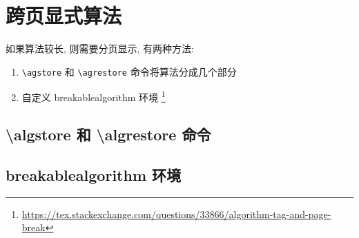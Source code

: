 \section{跨页显式算法}

如果算法较长, 则需要分页显示, 有两种方法:
\begin{enumerate}
  \item \verb|\agstore| 和 \verb|\agrestore| 命令将算法分成几个部分
  \item 自定义 {\ttfamily breakablealgorithm} 环境
  \footnote{\url{https://tex.stackexchange.com/questions/33866/algorithm-tag-and-page-break}}
\end{enumerate}

\subsection{{\ttfamily \textbackslash algstore} 和 {\ttfamily \textbackslash algrestore} 命令}


\subsection{{\ttfamily breakablealgorithm} 环境}

